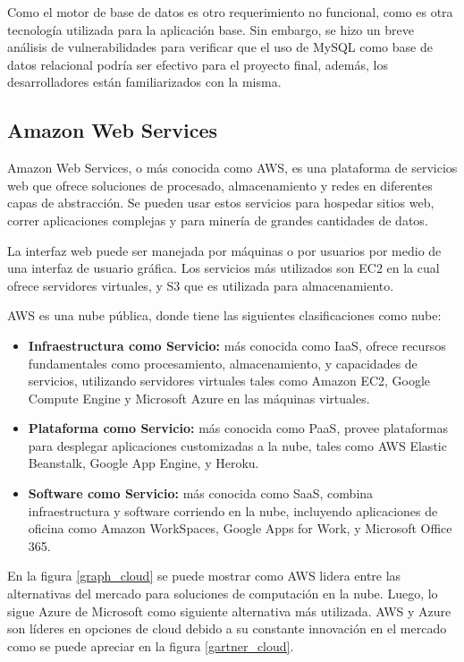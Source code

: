 Como el motor de base de datos es otro requerimiento no funcional, como es otra tecnología utilizada para la aplicación base. Sin embargo, se hizo un breve análisis de vulnerabilidades para verificar que el uso de MySQL como base de datos relacional podría ser efectivo para el proyecto final, además, los desarrolladores están familiarizados con la misma.

\subsection{Amazon Web Services}
Amazon Web Services, o más conocida como AWS, es una plataforma de servicios web que ofrece soluciones de procesado, almacenamiento y redes en diferentes capas de abstracción. Se pueden usar estos servicios para hospedar sitios web, correr aplicaciones complejas y para minería de grandes cantidades de datos\citep{wittig2015amazon}. 

La interfaz web puede ser manejada por máquinas o por usuarios por medio de una interfaz de usuario gráfica. Los servicios más utilizados son EC2 en la cual ofrece servidores virtuales, y S3 que es utilizada para almacenamiento.

AWS es una nube pública, donde tiene las siguientes clasificaciones como nube:
\begin{itemize}
	\item \textbf{Infraestructura como Servicio:} más conocida como IaaS, ofrece recursos fundamentales como procesamiento, almacenamiento, y capacidades de servicios, utilizando servidores virtuales tales como Amazon EC2, Google Compute Engine y Microsoft Azure en las máquinas virtuales.
	\item \textbf{Plataforma como Servicio:} más conocida como PaaS, provee plataformas para desplegar aplicaciones customizadas a la nube, tales como AWS Elastic Beanstalk, Google App Engine, y Heroku.
	\item \textbf{Software como Servicio:} más conocida como SaaS, combina infraestructura y software corriendo en la nube, incluyendo aplicaciones de oficina como Amazon WorkSpaces, Google Apps for Work, y Microsoft Office 365.
\end{itemize}

En la figura \ref{graph_cloud} se puede mostrar como AWS lidera entre las alternativas del mercado para soluciones de computación en la nube. Luego, lo sigue Azure de Microsoft como siguiente alternativa más utilizada. AWS y Azure son líderes en opciones de cloud debido a su constante innovación en el mercado como se puede apreciar en la figura \ref{gartner_cloud}.

